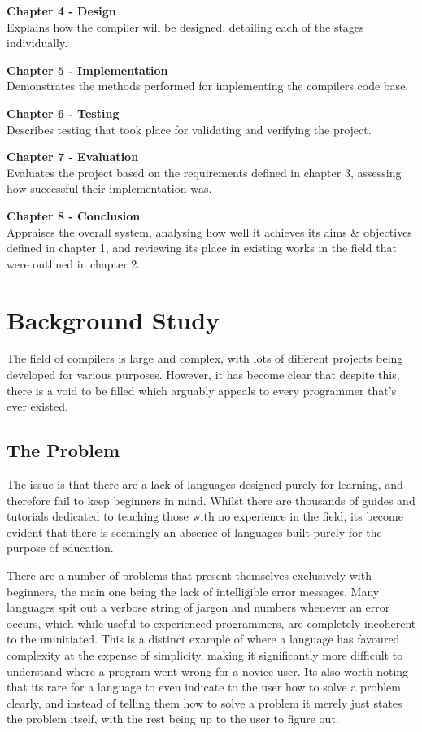 \documentclass[
]{report}
\begin{document}
\textbf{Chapter 4 - Design}\\
Explains how the compiler will be designed, detailing each of the stages
individually.

\textbf{Chapter 5 - Implementation}\\
Demonstrates the methods performed for implementing the compilers code
base.

\textbf{Chapter 6 - Testing}\\
Describes testing that took place for validating and verifying the
project.

\textbf{Chapter 7 - Evaluation}\\
Evaluates the project based on the requirements defined in chapter 3,
assessing how successful their implementation was.

\textbf{Chapter 8 - Conclusion}\\
Appraises the overall system, analysing how well it achieves its aims \&
objectives defined in chapter 1, and reviewing its place in existing
works in the field that were outlined in chapter 2.


\chapter{Background Study}
The field of compilers is large and complex, with lots of different
projects being developed for various purposes. However, it has become
clear that despite this, there is a void to be filled which arguably
appeals to every programmer that's ever existed.

\section{The Problem}
The issue is that there are a lack of languages designed purely for
learning, and therefore fail to keep beginners in mind. Whilst there are
thousands of guides and tutorials dedicated to teaching those with no
experience in the field, its become evident that there is seemingly an
absence of languages built purely for the purpose of education.

There are a number of problems that present themselves exclusively with
beginners, the main one being the lack of intelligible error messages.
Many languages spit out a verbose string of jargon and numbers whenever
an error occurs, which while useful to experienced programmers, are
completely incoherent to the uninitiated. This is a distinct example of
where a language has favoured complexity at the expense of simplicity,
making it significantly more difficult to understand where a program
went wrong for a novice user. Its also worth noting that its rare for a
language to even indicate to the user how to solve a problem clearly,
and instead of telling them how to solve a problem it merely just states
the problem itself, with the rest being up to the user to figure out.
\end{document}
